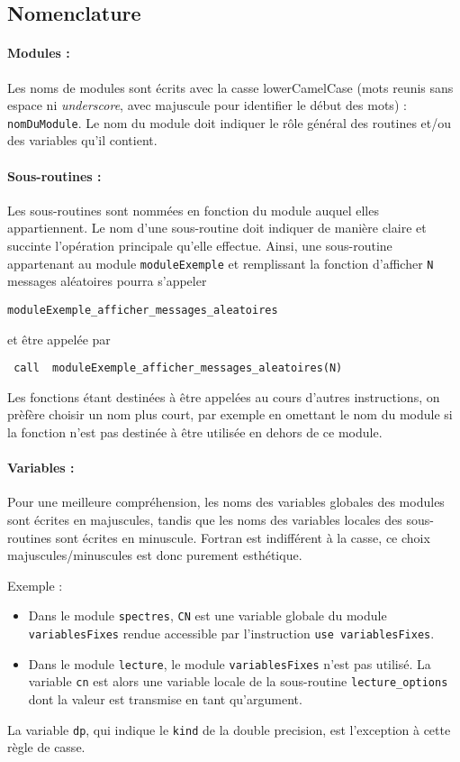 \subsection{Nomenclature}
\paragraph{Modules :}
Les noms de modules sont écrits avec la casse lowerCamelCase (mots reunis sans espace ni {\it underscore}, avec majuscule pour identifier le début des mots) : \lstinline{nomDuModule}.
Le nom du module doit indiquer le r\^ole général des routines et/ou des variables qu'il contient.

\paragraph{Sous-routines :} 
Les sous-routines sont nommées en fonction du module auquel elles appartiennent.
Le nom d'une sous-routine doit indiquer de manière claire et succinte l'opération principale qu'elle effectue.
Ainsi, une sous-routine appartenant au module \lstinline{moduleExemple} et remplissant la fonction d'afficher \lstinline{N} messages aléatoires pourra s'appeler 

\lstinline{moduleExemple_afficher_messages_aleatoires}

 et être appelée par
 
 \lstinline{ call  moduleExemple_afficher_messages_aleatoires(N)}

Les fonctions étant destinées à être appelées au cours d'autres instructions, on prèfère choisir un nom plus court, par exemple en omettant le nom du module si la fonction n'est pas destinée à être utilisée en dehors de ce module.

\paragraph{Variables :}
Pour une meilleure compréhension, les noms des variables globales des modules sont écrites en majuscules, tandis que les noms des variables locales des sous-routines sont écrites en minuscule.
Fortran est indifférent à la casse, ce choix majuscules/minuscules est donc purement esthétique.

Exemple : 
\begin{itemize}
\item Dans le module \lstinline{spectres}, \lstinline{CN} est une variable globale du module \lstinline{variablesFixes} rendue accessible par l'instruction \lstinline{use variablesFixes}.
\item Dans le module \lstinline{lecture}, le module \lstinline{variablesFixes} n'est pas utilisé.
 La variable \lstinline{cn} est alors une variable locale de la sous-routine \lstinline{lecture_options}  dont la valeur est transmise en tant qu'argument. 
\end{itemize}
La variable \lstinline{dp}, qui indique le \lstinline{kind} de la double precision, est l'exception à cette règle de casse.

